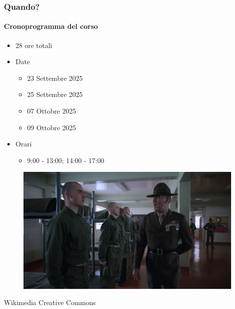 \begin{frame}[t,fragile] \frametitle{Quando?}
\framesubtitle{Cronoprogramma del corso}
    \begin{itemize}[leftmargin=10pt,align=right]
        \item[\alert{\faHandORight}] 28 ore totali
        \item[\alert{\faHandORight}] Date
        \begin{itemize}[leftmargin=10pt,align=right]
            \item[\alert{\faHandORight}] 23 Settembre 2025
            \item[\alert{\faHandORight}] 25 Settembre 2025
            \item[\alert{\faHandORight}] 07 Ottobre 2025
            \item[\alert{\faHandORight}] 09 Ottobre 2025
        \end{itemize}
        \item[\alert{\faHandORight}] Orari
        \begin{itemize}[leftmargin=10pt,align=right]
            \item[\alert{\faHandORight}] 9:00 - 13:00; 14:00 - 17:00
        \end{itemize}         
    \end{itemize}
    \begin{center}
        \begin{minipage}[b]{.45\textwidth}
		    \begin{figure}[ht]
			    \includegraphics[width=\textwidth]{img/full-metal-jacket.jpg}
		    \end{figure}
            \begin{flushright}
                \vspace*{-10pt}
                {\tiny\textcopyright Wikimedia Creative Commons}
            \end{flushright}
	    \end{minipage}
    \end{center}
\end{frame}

